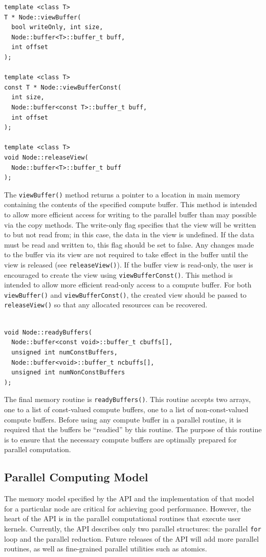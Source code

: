 \documentclass[10pt,conference,letterpaper]{IEEEtran}
\begin{document}
{\small \begin{verbatim}
template <class T>
T * Node::viewBuffer(
  bool writeOnly, int size, 
  Node::buffer<T>::buffer_t buff, 
  int offset
);
  
template <class T>
const T * Node::viewBufferConst(
  int size,
  Node::buffer<const T>::buffer_t buff,
  int offset
);
  
template <class T>
void Node::releaseView(
  Node::buffer<T>::buffer_t buff
);
\end{verbatim}}
The \verb!viewBuffer()! method returns a pointer to a location in main memory containing the contents of the specified compute buffer. This method is intended to allow more efficient access for writing to the parallel buffer than may possible via the copy methods. The write-only flag specifies that the view will be written to but not read from; in this case, the data in the view is undefined. If the data must be read and written to, this flag should be set to false. Any changes made to the buffer via its view are not required to take effect in the buffer until the view is released (see \verb!releaseView()!). If the buffer view is read-only, the user is encouraged to create the view using \verb!viewBufferConst()!. This method is intended to allow more efficient read-only access to a compute buffer. For both \verb!viewBuffer()! and \verb!viewBufferConst()!, the created view should be passed to \verb!releaseView()! so that any allocated resources can be recovered.

{\small \begin{verbatim}

void Node::readyBuffers(
  Node::buffer<const void>::buffer_t cbuffs[],  
  unsigned int numConstBuffers,
  Node::buffer<void>::buffer_t ncbuffs[], 
  unsigned int numNonConstBuffers
);
\end{verbatim}}
The final memory routine is \verb!readyBuffers()!. This routine accepts two arrays, one to a list of const-valued compute buffers, one to a list of non-const-valued compute buffers. Before using any compute buffer in a parallel routine, it is required that the buffers be ``readied'' by this routine. The purpose of this routine is to ensure that the necessary compute buffers are optimally prepared for parallel computation.

\subsection{Parallel Computing Model}

The memory model specified by the API and the implementation of that model for a particular node are critical for achieving good performance. However, the heart of the API is in the parallel computational routines that execute user kernels. Currently, the API describes only two parallel structures: the parallel \verb!for! loop and the parallel reduction. Future releases of the API will add more parallel routines, as well as fine-grained parallel utilities such as atomics.
\end{document}

